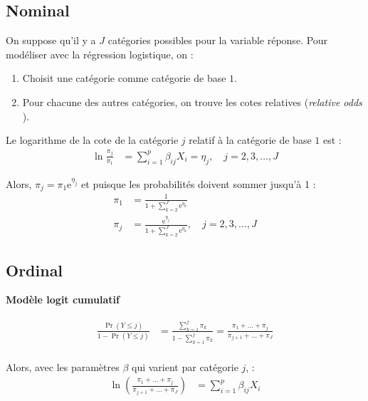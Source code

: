 \documentclass[french]{article}
\begin{document}
\begin{multicols*}{2}
\bigskip


\subsection{Nominal}
On suppose qu'il y a $J$ catégories possibles pour la variable réponse. 
Pour modéliser avec la régression logistique, on :
\begin{enumerate}[label	=	\circled{\arabic*}{lightgray}]
	\item	Choisit une catégorie comme catégorie de base $1$.
	\item	Pour chacune des autres catégories, on trouve les cotes relatives (\og \textit{relative odds} \fg{}).
\end{enumerate}

Le logarithme de la cote de la catégorie $j$ relatif à la catégorie de base $1$ est :
\begin{align*}
	\ln \frac{\pi_{j}}{\pi_{1}}
	&=	\sum_{i	=	1}^{p} \beta_{ij} X_{i}
	=	\eta_{j}, \quad j	=	2, 3, \dots, J
\end{align*}

Alors, $\pi_{j}	=	\pi_{1}\textrm{e}^{\eta_{j}}$ et puisque les probabilités doivent sommer jusqu'à 1 :
\begin{align*}
	\pi_{1}
	&=	\frac{1}{1 + \sum_{k	=	2}^{J} \textrm{e}^{\eta_{k}}}	\\
	\pi_{j}
	&=	\frac{\textrm{e}^{\eta_{j}}}{1 + \sum_{k	=	2}^{J} \textrm{e}^{\eta_{k}}}, \quad j	=	2, 3, \dots, J
\end{align*}



\subsection{Ordinal}
\textbf{Modèle logit cumulatif}

\begin{align*}
	\frac{\Pr(Y \leq j)}{1	-	\Pr(Y \leq j)}
	&=	\frac{\sum_{k	=	1}^{j} \pi_{k}}{1	-	\sum_{k	=	1}^{j} \pi_{k}}	
	=	\frac{\pi_{1} + \hdots + \pi_{j}}{\pi_{j + 1} + \hdots + \pi_{J}}	\\
\end{align*}

Alors, avec les paramètres $\beta$ qui varient par catégorie $j$, :
\begin{align*}
	\ln\left(\frac{\pi_{1} + \hdots + \pi_{j}}{\pi_{j + 1} + \hdots + \pi_{J}}\right)
	&=	\sum_{i	=	1}^{p}\beta_{ij}X_{i}	\\
\end{align*}


\end{multicols*}
\end{document}
